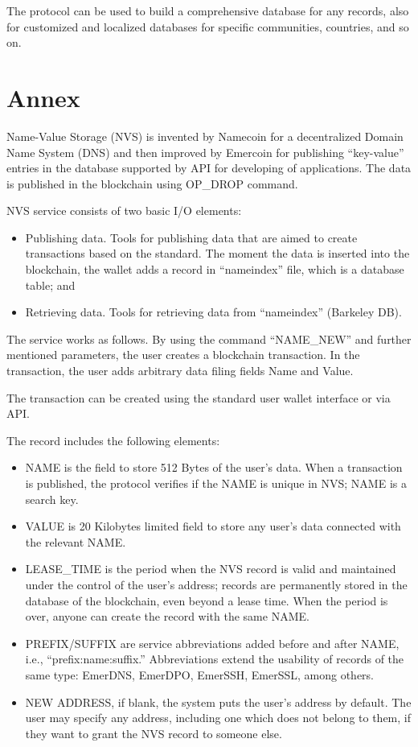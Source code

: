 \begin{multicols}{2}
The protocol can be used to build a comprehensive database for any records, also for customized and localized databases for specific communities, countries, and so on.

\section*{Annex}

Name-Value Storage (NVS) is invented by Namecoin for a decentralized Domain Name System (DNS) and then improved by Emercoin for publishing “key-value” entries in the database supported by API for developing of applications. The data is published in the blockchain using OP\_DROP command.

NVS service consists of two basic I/O elements:
\begin{itemize}
\item[(1)] Publishing data. Tools for publishing data that are aimed to create transactions based on the standard. The moment the data is inserted into the blockchain, the wallet adds a record in “nameindex” file, which is a database table; and
\item[(2)] Retrieving data. Tools for retrieving data from “nameindex” (Barkeley DB).
\end{itemize}

The service works as follows. By using the command “NAME\_NEW” and further mentioned parameters, the user creates a blockchain transaction. In the transaction, the user adds arbitrary data filing fields Name and Value.

The transaction can be created using the standard user wallet interface or via API.

The record includes the following elements:
\begin{itemize}
\item NAME is the field to store 512 Bytes of the user’s data. When a transaction is published, the protocol verifies if the NAME is unique in NVS; NAME is a search key.
\item VALUE is 20 Kilobytes limited field to store any user’s data connected with the relevant NAME.
\item LEASE\_TIME is the period when the NVS record is valid and maintained under the control of the user’s address; records are permanently stored in the database of the blockchain, even beyond a lease time. When the period is over, anyone can create the record with the same NAME.
\item PREFIX/SUFFIX are service abbreviations added before and after NAME, i.e., “prefix:name:suffix.” Abbreviations extend the usability of records of the same type: EmerDNS, EmerDPO, EmerSSH, EmerSSL, among others.
\item NEW ADDRESS, if blank, the system puts the user’s address by default. The user may specify any address, including one which does not belong to them, if they want to grant the NVS record to someone else.
\end{itemize}


\end{multicols}
